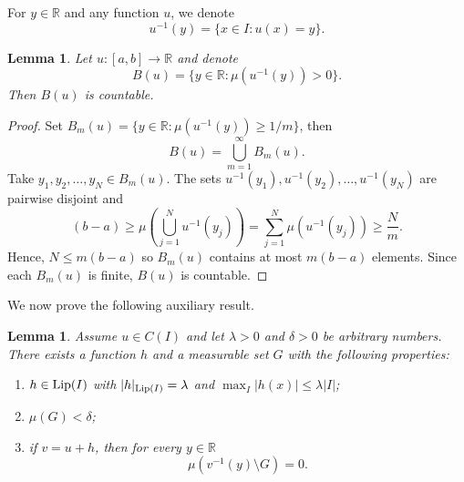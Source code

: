 \documentclass{amsart}
\newtheorem{lem}[theorem]{Lemma}
\numberwithin{equation}{section}
\begin{document}
For $y\in\mathbb{R}$ and any function $u$, we denote
\begin{equation}
    \nonumber
    u^{-1}(y)=\{x\in I: u(x)=y\}.
\end{equation}
\begin{lem}
    \label{countLemma}
    Let $u:[a,b]\rightarrow\mathbb{R}$ and denote
    \begin{equation}
        \nonumber
        B(u)=\{y\in\mathbb{R}:\mu(u^{-1}(y))>0\}.
    \end{equation}
    Then $B(u)$ is countable.
\end{lem}
\begin{proof}
    Set $B_m(u)=\{y\in\mathbb{R}:\mu(u^{-1}(y))\ge 1/m\}$, then
\begin{equation}
    \nonumber
    B(u)=\bigcup_{m=1}^\infty B_m(u).
\end{equation}
Take $y_1,y_2,\ldots, y_N\in B_m(u)$. The sets $u^{-1}(y_1),u^{-1}(y_2),\ldots, u^{-1}(y_N)$ are pairwise disjoint and
\begin{equation}
    \nonumber
    (b-a)\ge\mu\left(\bigcup_{j=1}^Nu^{-1}(y_j)\right)=\sum_{j=1}^N\mu(u^{-1}(y_j))\ge\frac{N}{m}.
\end{equation}
Hence, $N\le m(b-a)$ so $B_m(u)$ contains at most $m(b-a)$ elements. Since each $B_m(u)$ is finite, $B(u)$ is countable.
\end{proof}
We now prove the following auxiliary result. 
\begin{lem}
    \label{constructiveLemma}
    Assume $u\in C(I)$ and let $\lambda>0$ and $\delta>0$ be arbitrary numbers. There exists a function $h$ and a measurable set $G$ with the following properties:
    \begin{enumerate}
        \item $h\in{\rm Lip}(I)$ with $|h|_{{\rm Lip}(I)}=\lambda$ and $\max_I |h(x)|\le\lambda|I|$;
        \item $\mu(G)<\delta$;
        \item if $v=u+h$, then for every $y\in\mathbb{R}$
    \begin{equation}
        \nonumber
        \mu(v^{-1}(y)\setminus G)=0.
    \end{equation}
    \end{enumerate}
\end{lem}  
\end{document}
